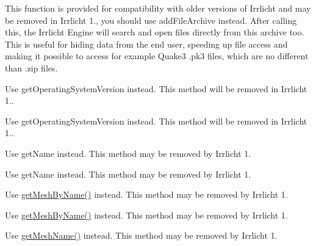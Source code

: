 \begin{DoxyRefList}
This function is provided for compatibility with older versions of Irrlicht and may be removed in Irrlicht 1., you should use add\+File\+Archive instead. After calling this, the Irrlicht Engine will search and open files directly from this archive too. This is useful for hiding data from the end user, speeding up file access and making it possible to access for example Quake3 .pk3 files, which are no different than .zip files.  
\item[\label{deprecated__deprecated000016}%
\Hypertarget{deprecated__deprecated000016}%
Member \hyperlink{classirr_1_1IOSOperator_a8d634ee79439742b7397ca7ad7a3812a}{irr\+:\+:I\+O\+S\+Operator\+:\+:get\+Operation\+System\+Version} () const]Use get\+Operating\+System\+Version instead. This method will be removed in Irrlicht 1.. 

Use get\+Operating\+System\+Version instead. This method will be removed in Irrlicht 1..  
\item[\label{deprecated__deprecated000001}%
\Hypertarget{deprecated__deprecated000001}%
Member \hyperlink{classirr_1_1scene_1_1IBoneSceneNode_a1c40bee44b89fe81178782e999cbe3a8}{irr\+:\+:scene\+:\+:I\+Bone\+Scene\+Node\+:\+:get\+Bone\+Name} () const]Use get\+Name instead. This method may be removed by Irrlicht 1. 

Use get\+Name instead. This method may be removed by Irrlicht 1.  
\item[\label{deprecated__deprecated000009}%
\Hypertarget{deprecated__deprecated000009}%
Member \hyperlink{classirr_1_1scene_1_1IMeshCache_aa3946324e39cc074b1f73e01d57cae70}{irr\+:\+:scene\+:\+:I\+Mesh\+Cache\+:\+:get\+Mesh\+By\+Filename} (const \hyperlink{namespaceirr_1_1io_a6468281622ce3a1c46b72e19f32dded5}{io\+::path} \&filename)]Use \hyperlink{classirr_1_1scene_1_1IMeshCache_a4c93e736bdca8c84d478afc82540d6bb}{get\+Mesh\+By\+Name()} instead. This method may be removed by Irrlicht 1. 

Use \hyperlink{classirr_1_1scene_1_1IMeshCache_a4c93e736bdca8c84d478afc82540d6bb}{get\+Mesh\+By\+Name()} instead. This method may be removed by Irrlicht 1.  
\item[\label{deprecated__deprecated000010}%
\Hypertarget{deprecated__deprecated000010}%
Member \hyperlink{classirr_1_1scene_1_1IMeshCache_afda96c4fb8ab272f3d3688dcaef3abc3}{irr\+:\+:scene\+:\+:I\+Mesh\+Cache\+:\+:get\+Mesh\+Filename} (u32 index) const]Use \hyperlink{classirr_1_1scene_1_1IMeshCache_af06efb8fb21f6bba16e52d879b5d3ddd}{get\+Mesh\+Name()} instead. This method may be removed by Irrlicht 1. 


\end{DoxyRefList}
